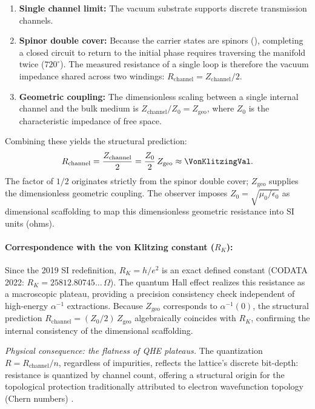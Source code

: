 \begin{enumerate}
    \item \textbf{Single channel limit:} The vacuum substrate supports discrete transmission channels.
    
    \item \textbf{Spinor double cover:} Because the carrier states are spinors (), completing a closed circuit to return to the initial phase requires traversing the manifold twice ($720^\circ$). The measured resistance of a single loop is therefore the vacuum impedance shared across two windings: $R_{\text{channel}} = Z_{\text{channel}}/2$.
    
    \item \textbf{Geometric coupling:} The dimensionless scaling between a single internal channel and the bulk medium is $Z_{\text{channel}} / Z_0 = Z_{\text{geo}}$, where $Z_0$ is the characteristic impedance of free space.
\end{enumerate}

Combining these yields the structural prediction:
\begin{equation}
    R_{\text{channel}} = \frac{Z_{\text{channel}}}{2} = \frac{Z_0}{2} \, Z_{\text{geo}} \approx \mathbf{\VonKlitzingVal}.
\end{equation}
The factor of $1/2$ originates strictly from the spinor double cover; $Z_{\text{geo}}$ supplies the dimensionless geometric coupling. The observer imposes $Z_0 = \sqrt{\mu_0/\epsilon_0}$ as dimensional scaffolding to map this dimensionless geometric resistance into SI units (ohms).

\paragraph{Correspondence with the von Klitzing constant ($R_K$):}
Since the 2019 SI redefinition, $R_K = h/e^2$ is an exact defined constant (CODATA 2022: $R_K = 25812.80745\ldots\,\Omega$). The quantum Hall effect realizes this resistance as a macroscopic plateau, providing a precision consistency check independent of high-energy $\alpha^{-1}$ extractions. Because $Z_{\text{geo}}$ corresponds to $\alpha^{-1}(0)$, the structural prediction $R_{\text{channel}} = (Z_0/2) \, Z_{\text{geo}}$ algebraically coincides with $R_K$, confirming the internal consistency of the dimensional scaffolding.


\textit{Physical consequence: the flatness of QHE plateaus.} 
The quantization $R = R_{\text{channel}}/n$, regardless of impurities, reflects the lattice's discrete bit-depth: resistance is quantized by channel count, offering a structural origin for the topological protection traditionally attributed to electron wavefunction topology (Chern numbers) \cite{thouless_quantized_1982, kohmoto_topological_1985}.

